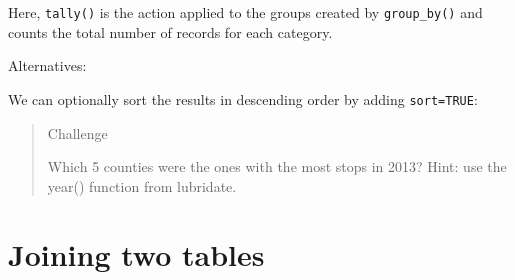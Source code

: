 \documentclass[]{book}
\newenvironment{Shaded}{\begin{snugshade}}{\end{snugshade}}
\newcommand{\CommentTok}[1]{\textcolor[rgb]{0.56,0.35,0.01}{\textit{#1}}}
\newcommand{\DataTypeTok}[1]{\textcolor[rgb]{0.13,0.29,0.53}{#1}}
\newcommand{\KeywordTok}[1]{\textcolor[rgb]{0.13,0.29,0.53}{\textbf{#1}}}
\newcommand{\NormalTok}[1]{#1}
\newcommand{\OperatorTok}[1]{\textcolor[rgb]{0.81,0.36,0.00}{\textbf{#1}}}
\newcommand{\OtherTok}[1]{\textcolor[rgb]{0.56,0.35,0.01}{#1}}
\newcommand{\StringTok}[1]{\textcolor[rgb]{0.31,0.60,0.02}{#1}}
\begin{document}
\begin{Shaded}
\end{Shaded}

Here, \texttt{tally()} is the action applied to the groups created by \texttt{group\_by()} and counts the total number of records for each category.

Alternatives:

\begin{Shaded}
\end{Shaded}

We can optionally sort the results in descending order by adding \texttt{sort=TRUE}:

\begin{Shaded}
\end{Shaded}

\begin{quote}
Challenge

Which 5 counties were the ones with the most stops in 2013?
Hint: use the year() function from lubridate.
\end{quote}

\hypertarget{joining-two-tables}{%
\section{Joining two tables}\label{joining-two-tables}}
\end{document}
